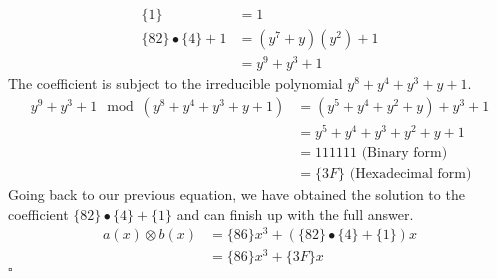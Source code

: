 \documentclass[12pt]{article}
\newcommand{\EOQ}{\hfill $\square$}
\begin{document}
\begin{enumerate}[(a)]
\begin{equation*}
\begin{split}
\{1\}&=1\\
\{82\}\bullet \{4\}+1&=(y^7+y)(y^2)+1\\
&=y^9+y^3+1
\end{split}
\end{equation*}
The coefficient is subject to the irreducible polynomial $y^8+y^4+y^3+y+1$.
\begin{equation*}
\begin{split}
y^9+y^3+1\mod (y^8+y^4+y^3+y+1)&=(y^5+y^4+y^2+y)+y^3+1\\
&=y^5+y^4+y^3+y^2+y+1\\
&=111111\text{~(Binary form)}\\
&=\{3F\}\text{~(Hexadecimal form)}
\end{split}
\end{equation*}
Going back to our previous equation, we have obtained the solution to the coefficient $\{82\}\bullet\{4\}+\{1\}$ and can finish up with the full answer.
\begin{equation*}
\begin{split}
a(x)\otimes b(x)&=\{86\}x^3+(\{82\}\bullet\{4\}+\{1\})x\\
&=\{86\}x^3+\{3F\}x
\end{split}
\end{equation*}\EOQ
\end{enumerate}
\end{document}
